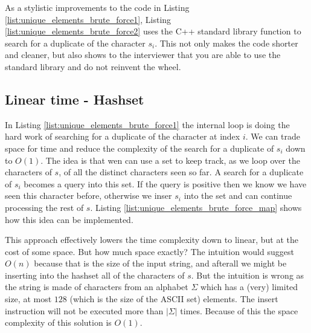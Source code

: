As a stylistic improvements to the code in Listing \ref{list:unique_elements_brute_force1}, Listing
\ref{list:unique_elements_brute_force2}  uses the C++ standard library function  to
search for a duplicate of the character $s_i$. 
This not only makes the code shorter and cleaner,
but also shows to the interviewer that you are able to use the standard library and do not reinvent the wheel.



\subsection{Linear time - Hashset}
In Listing \ref{list:unique_elements_brute_force1} the internal loop is doing the hard work of
searching for a duplicate of the character at index $i$. We can trade space for time and reduce the
complexity of the  search for a duplicate of $s_i$ down to $O(1)$.
The idea is that wen can use a set to keep track, as we loop over the characters of $s$, of all the distinct characters seen so far.
A search for a duplicate of $s_i$ becomes a query into this set. If the query is positive then we know we have seen this character before, otherwise 
we inser $s_i$ into the set and can continue  processing the rest of $s$.
Listing \ref{list:unique_elements_brute_force_map} shows how this idea can be implemented.





This approach effectively lowers the time complexity down to linear, but at the cost of some
space. But how much space exactly? 
The intuition would suggest $O(n)$ because that is the size of the
input string, and afterall we might be inserting into the hashset all of the characters of $s$.
But the intuition is wrong as the string is made of characters from an alphabet $\Sigma$ 
which has a (very) limited size, at most $128$ (which is the size of the ASCII set) elements.
The insert instruction will not be
executed more than $|\Sigma|$ times.
Because of this the space complexity of this solution is $O(1)$. 


